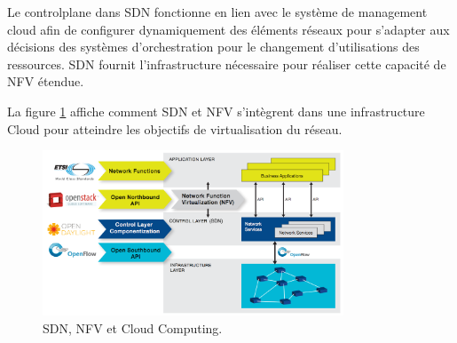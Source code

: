 
Le \gls{controlplane} dans SDN fonctionne en lien avec le système de management cloud afin de configurer dynamiquement des éléments réseaux pour s'adapter aux décisions des systèmes d'orchestration pour le changement d'utilisations des ressources. SDN fournit l'infrastructure nécessaire pour réaliser cette capacité de NFV étendue.

La figure \ref{cloud-sdn-nfv} affiche comment SDN et NFV s'intègrent dans une infrastructure Cloud pour atteindre les objectifs de virtualisation du réseau. \\

\begin{figure}[h]
\begin{center}
\includegraphics[width=0.8\textwidth]{images/cloud-sdn-nfv} 
\caption{SDN, NFV et Cloud Computing. \cite{OFSDNNFVand}} \label{cloud-sdn-nfv}
\end{center}
\end{figure} 

